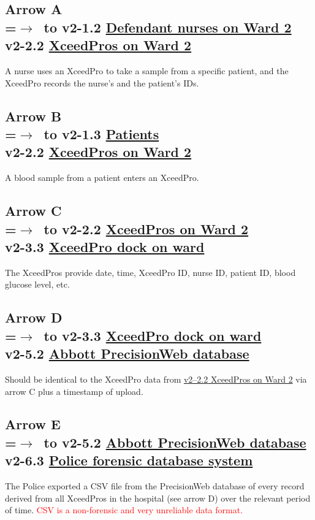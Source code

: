 \documentclass[10pt,a4wide]{article}
\def\warn#1{\textcolor{red}{#1}} %
\begin{document}
\subsection*{Arrow  A\\
=\hbox{$\rightarrow$~}\hbox to v2-1.2 \hyperlink{1}{Defendant nurses on Ward 2}\\v2-2.2 \hyperlink{4}{XceedPros on Ward 2}}
A nurse uses an XceedPro to take a sample from a specific patient, and the XceedPro records the nurse's and the patient's IDs.
\subsection*{Arrow  B\\
=\hbox{$\rightarrow$~}\hbox to v2-1.3 \hyperlink{2}{Patients}\\v2-2.2 \hyperlink{4}{XceedPros on Ward 2}}
A blood sample from a patient enters an XceedPro.
\subsection*{Arrow  C\\
=\hbox{$\rightarrow$~}\hbox to v2-2.2 \hyperlink{4}{XceedPros on Ward 2}\\v2-3.3 \hyperlink{5}{XceedPro dock on ward}}
The XceedPros provide date, time, XceedPro ID, nurse ID, patient ID, blood glucose level, etc.
\subsection*{Arrow  D\\
=\hbox{$\rightarrow$~}\hbox to v2-3.3 \hyperlink{5}{XceedPro dock on ward}\\v2-5.2 \hyperlink{7}{Abbott PrecisionWeb database}}
Should be identical to the XceedPro data from \hyperlink{4}{{v2--2.2} XceedPros on Ward 2} via arrow C plus a timestamp of upload.
\subsection*{Arrow  E\\
=\hbox{$\rightarrow$~}\hbox to v2-5.2 \hyperlink{7}{Abbott PrecisionWeb database}\\v2-6.3 \hyperlink{11}{Police forensic database system}}
The Police exported a CSV file from the PrecisionWeb database of every record derived from all XceedPros in the hospital (see arrow D) over the relevant period of time. \warn{CSV is a  non-forensic and very unreliable data format.}
\end{document}
